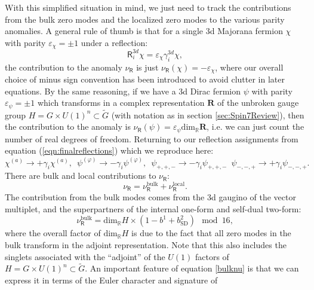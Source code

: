 \documentclass[12pt]{article}%
\numberwithin{equation}{section}
\renewcommand{\(}{\left(}
\renewcommand{\)}{\right)}
\renewcommand{\[}{\left[}
\renewcommand{\]}{\right]}
\begin{document}
With this simplified situation in mind, we just need to track the contributions
from the bulk zero modes and the localized zero modes
to the various parity anomalies. A general rule of thumb is that for a single
3d Majorana fermion $\chi$ with parity $\varepsilon_{\chi} = \pm 1$ under a reflection:
\begin{equation}
\mathsf{R}_{i}^{3d} \chi = \varepsilon_{\chi} \gamma_{i}^{3d} \chi,
\end{equation}
the contribution to the anomaly $\nu_{\mathsf{R}}$ is just $\nu_{\mathsf{R}}(\chi) = - \varepsilon_{\chi}$,
where our overall choice of minus sign convention has been introduced to avoid clutter in later equations.
By the same reasoning, if we have a 3d Dirac fermion $\psi$ with parity $\varepsilon_{\psi} = \pm 1$ which transforms in a complex representation $\mathbf{R}$ of the unbroken gauge group $H = G \times U(1)^n \subset \widetilde{G}$ (with notation as in section \ref{sec:Spin7Review}),
then the contribution to the anomaly is $\nu_{\mathsf{R}}(\psi) = \varepsilon_{\psi} \mathrm{dim}_{\mathbb{R}} \mathbf{R} $, i.e. we can just count the number of real degrees of freedom. Returning to our reflection assignments
from equation (\ref{eqn:finalreflections}) which we reproduce here:
\begin{equation}
\chi^{(a)} \rightarrow + \gamma_{i} \chi^{(a)}, \,\,\, \psi^{(\varphi)} \rightarrow - \gamma_{i} \psi^{(\varphi)}, \,\,\,
\psi_{+,+,-} \rightarrow - \gamma_{i} \psi_{+,+,-} \,\,\, \psi_{-,-,+} \rightarrow + \gamma_{i} \psi_{-,-,+}.
\end{equation}
There are bulk and local contributions to $\nu_{\mathsf{R}}$:
\begin{equation}
\nu_{\mathsf{R}} = \nu^{\mathrm{bulk}}_{\mathsf{R}} + \nu^{\mathrm{local}}_{\mathsf{R}}.
\end{equation}
The contribution from the bulk modes comes from the 3d gaugino of the vector multiplet,
and the superpartners of the internal one-form and self-dual two-form:
\begin{equation} \label{bulknu}
\nu^{\mathrm{bulk}}_{\mathsf{R}} = \mathrm{dim}_{\mathbb{R}} H \times (1 - b^{1} + b^{2}_{\mathrm{SD}}) \mod 16,
\end{equation}
where the overall factor of $\mathrm{dim}_{\mathbb{R}} H$ is due to the fact that
all zero modes in the bulk transform in the adjoint representation. Note that this also includes the
singlets associated with the ``adjoint'' of the $U(1)$ factors of $H = G \times U(1)^n \subset \widetilde{G}$.
An important feature of equation \ref{bulknu} is that we can express it in terms of the Euler character and signature of
\end{document}
